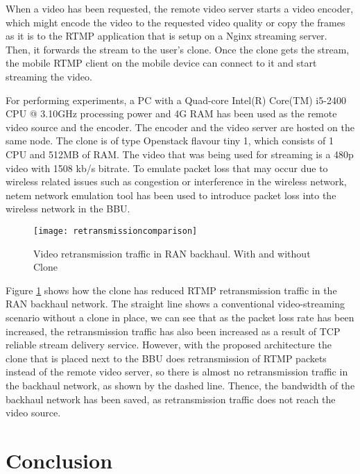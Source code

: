\documentclass[12pt,journal,compsoc, onecolumn]{IEEEtran}
\begin{document}
When a video has been requested, the remote video server starts a video encoder, which might encode the video to the requested video quality or copy the frames as it is to the RTMP application that is setup on a Nginx streaming server. Then, it forwards the stream to the user's clone. Once the clone gets the stream, the mobile RTMP client on the mobile device can connect to it and start streaming the video.

For performing experiments, a PC with a Quad-core Intel(R) Core(TM) i5-2400 CPU @ 3.10GHz processing power and 4G RAM has been used as the remote video source and the encoder. The encoder and the video server are hosted on the same node. The clone is of type Openstack flavour tiny 1, which consists of 1 CPU and 512MB of RAM. The video that was being used for streaming is a 480p video with 1508 kb/s bitrate. To emulate packet loss that may occur due to wireless related issues such as congestion or interference in the wireless network, netem network emulation tool has been used to introduce packet loss into the wireless network in the BBU.

\begin{figure}
\centering
  \texttt{[image: retransmissioncomparison]}
  \caption{\label{fig:retranscomparison } Video retransmission traffic in RAN backhaul. With and without Clone}
\end{figure}

Figure \ref{fig:retranscomparison } shows how the clone has reduced RTMP retransmission traffic in the RAN backhaul network.  The straight line shows a conventional video-streaming scenario without a clone in place, we can see that as the packet loss rate has been increased, the retransmission traffic has also been increased as a result of TCP reliable stream delivery service. However, with the proposed architecture the clone that is placed next to the BBU does retransmission of RTMP packets instead of the remote video server, so there is almost no retransmission traffic in the backhaul network, as shown by the dashed line. Thence, the bandwidth of the backhaul network has been saved, as retransmission traffic does not reach the video source.

\section{Conclusion}
\end{document}
